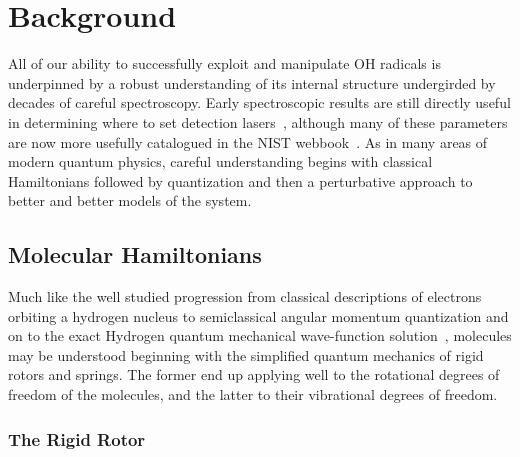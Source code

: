 \ifx\justbeingincluded\undefined


\fi

\chapter{Background}
\label{chapter:Background}

All of our ability to successfully exploit and manipulate OH radicals is underpinned by a robust understanding of its internal structure undergirded by decades of careful spectroscopy.
Early spectroscopic results are still directly useful in determining where to set detection lasers~\cite{Meerts1975}, although many of these parameters are now more usefully catalogued in the NIST webbook~\cite{Huber2018}.
As in many areas of modern quantum physics, careful understanding begins with classical Hamiltonians followed by quantization and then a perturbative approach to better and better models of the system. 

\section{Molecular Hamiltonians}

Much like the well studied progression from classical descriptions of electrons orbiting a hydrogen nucleus to semiclassical angular momentum quantization and on to the exact Hydrogen quantum mechanical wave-function solution~\citep[Sec.~4.2]{Griffiths2018}, molecules may be understood beginning with the simplified quantum mechanics of rigid rotors and springs.
The former end up applying well to the rotational degrees of freedom of the molecules, and the latter to their vibrational degrees of freedom.


\subsection{The Rigid Rotor}

